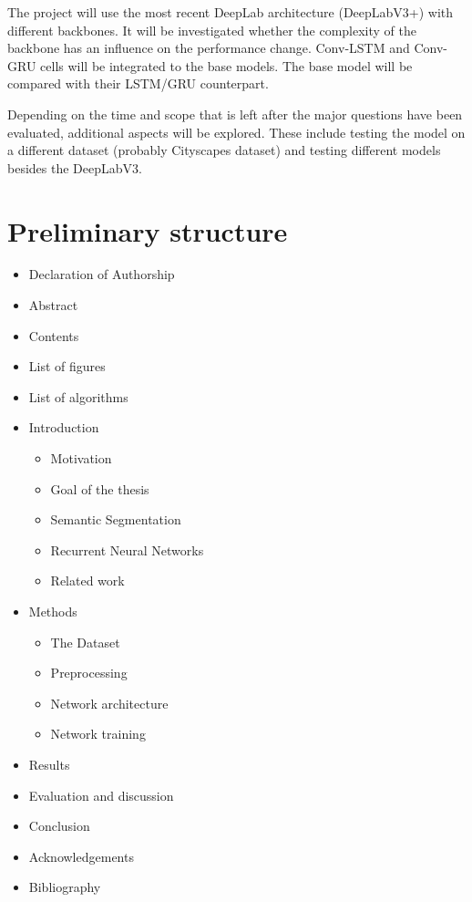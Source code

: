 \documentclass[11pt,
  paper=a4, 
  bibliography=totocnumbered,
	captions=tableheading,
	BCOR=10mm
]{scrreprt}
\theoremstyle{definition}
\begin{document}
The project will use the most recent DeepLab architecture (DeepLabV3+) with different backbones.
It will be investigated whether the complexity of the backbone has an influence on the performance change.
Conv-LSTM and Conv-GRU cells will be integrated to the base models.
The base model will be compared with their LSTM/GRU counterpart.

Depending on the time and scope that is left after the major questions have been evaluated, additional aspects will be explored.
These include testing the model on a different dataset (probably Cityscapes dataset) and testing different models besides the DeepLabV3.



\chapter{Preliminary structure}

\begin{itemize}
	\item Declaration of Authorship
	\item Abstract
	\item Contents
	\item List of figures
	\item List of algorithms
	\item Introduction
	\begin{itemize}
		\item Motivation
		\item Goal of the thesis
		\item Semantic Segmentation
		\item Recurrent Neural Networks
		\item Related work
	\end{itemize}
	\item Methods
	\begin{itemize}
		\item The Dataset
		\item Preprocessing
		\item Network architecture
		\item Network training
	\end{itemize}
	\item Results 
	\item Evaluation and discussion
	\item Conclusion
	\item Acknowledgements
	\item Bibliography
\end{itemize}
\end{document}
